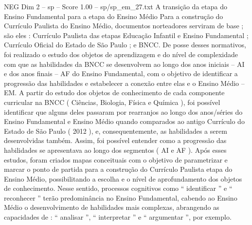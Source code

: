 \begin{textsample}{NEG Dim 2 – sp – Score 1.00 – sp/sp\_em\_27.txt}  \label{ex:f2_neg_088}
A transição da etapa do Ensino Fundamental para a etapa do Ensino Médio Para a construção do Currículo Paulista do Ensino Médio, documentos norteadores serviram de base ; são eles : Currículo Paulista das etapas Educação Infantil e Ensino Fundamental ; Currículo Oficial do Estado de São Paulo ; e BNCC.
De posse desses normativos, foi realizado o estudo dos objetos de aprendizagem e do nível de complexidade com que as habilidades da BNCC se desenvolvem ao longo dos anos iniciais – AI e dos anos finais – AF do Ensino Fundamental, com o objetivo de identificar a progressão das habilidades e estabelecer a conexão entre elas e o Ensino Médio – EM.
A partir do estudo dos objetos de conhecimento de cada componente curricular na BNCC ( Ciências, Biologia, Física e Química ), foi possível identificar que alguns deles passaram por rearranjos ao longo dos anos/séries do Ensino Fundamental e Ensino Médio quando comparados ao antigo Currículo do Estado de São Paulo ( 2012 ), e, consequentemente, as habilidades a serem desenvolvidas também.
Assim, foi possível entender como a progressão das habilidades se apresentava ao longo dos segmentos ( AI e AF ).
Após esses estudos, foram criados mapas conceituais com o objetivo de parametrizar e marcar o ponto de partida para a construção do Currículo Paulista etapa do Ensino Médio, possibilitando a escolha e o nível de aprofundamento dos objetos de conhecimento.
Nesse sentido, processos cognitivos como “ identificar ” e “ reconhecer ” terão predominância no Ensino Fundamental, cabendo ao Ensino Médio o desenvolvimento de habilidades mais complexas, abrangendo as capacidades de : “ analisar ”, “ interpretar ” e “ argumentar ”, por exemplo.

\end{textsample}
